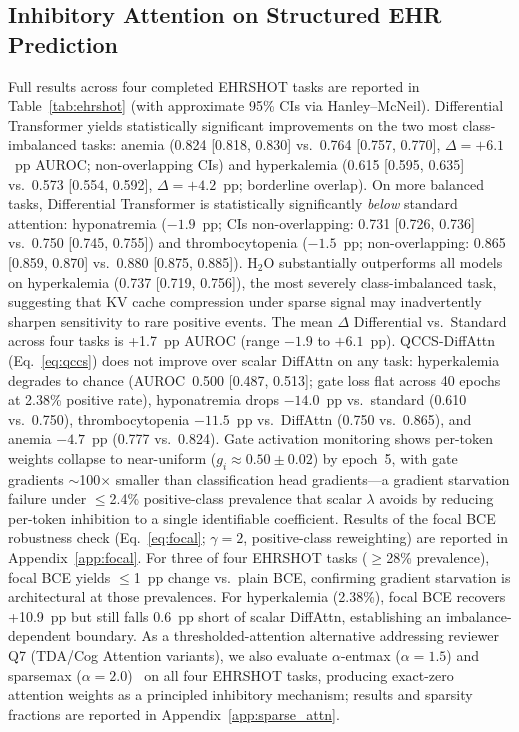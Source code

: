 \documentclass{article}
\begin{document}
\subsection{Inhibitory Attention on Structured EHR Prediction}

Full results across four completed EHRSHOT tasks are reported in
Table~\ref{tab:ehrshot} (with approximate 95\% CIs via Hanley--McNeil). Differential
Transformer yields statistically significant improvements on the two most
class-imbalanced tasks: anemia (0.824 [0.818, 0.830] vs.\ 0.764 [0.757, 0.770],
$\Delta{=}{+}6.1$~pp AUROC; non-overlapping CIs) and hyperkalemia (0.615 [0.595, 0.635]
vs.\ 0.573 [0.554, 0.592], $\Delta{=}{+}4.2$~pp; borderline overlap).
On more balanced tasks, Differential Transformer is statistically significantly
\emph{below} standard attention: hyponatremia ($-1.9$~pp; CIs non-overlapping:
0.731 [0.726, 0.736] vs.\ 0.750 [0.745, 0.755]) and thrombocytopenia
($-1.5$~pp; non-overlapping: 0.865 [0.859, 0.870] vs.\ 0.880 [0.875, 0.885]).
H$_2$O substantially outperforms all models on hyperkalemia (0.737 [0.719, 0.756]),
the most severely class-imbalanced task, suggesting that KV cache compression
under sparse signal may inadvertently sharpen sensitivity to rare positive events.
The mean $\Delta$ Differential vs.\ Standard across four tasks is +1.7~pp AUROC
(range $-1.9$ to $+6.1$~pp). QCCS-DiffAttn (Eq.~\ref{eq:qccs}) does not improve
over scalar DiffAttn on any task: hyperkalemia degrades to chance (AUROC~0.500
[0.487, 0.513]; gate loss flat across 40 epochs at 2.38\% positive rate),
hyponatremia drops $-14.0$~pp vs.\ standard (0.610 vs.\ 0.750), thrombocytopenia
$-11.5$~pp vs.\ DiffAttn (0.750 vs.\ 0.865), and anemia $-4.7$~pp (0.777 vs.\ 0.824).
Gate activation monitoring shows per-token weights collapse to near-uniform
($g_i \approx 0.50 \pm 0.02$) by epoch~5, with gate gradients $\sim$100$\times$
smaller than classification head gradients---a gradient starvation failure
under $\leq$2.4\% positive-class prevalence that scalar $\lambda$ avoids by
reducing per-token inhibition to a single identifiable coefficient.
Results of the focal BCE robustness check (Eq.~\ref{eq:focal}; $\gamma=2$,
positive-class reweighting) are reported in Appendix~\ref{app:focal}. For three
of four EHRSHOT tasks ($\geq$28\% prevalence), focal BCE yields $\leq$1~pp change
vs.\ plain BCE, confirming gradient starvation is architectural at those prevalences.
For hyperkalemia (2.38\%), focal BCE recovers +10.9~pp but still falls 0.6~pp
short of scalar DiffAttn, establishing an imbalance-dependent boundary.
As a thresholded-attention alternative addressing reviewer Q7 (TDA/Cog Attention
variants), we also evaluate $\alpha$-entmax ($\alpha{=}1.5$) and sparsemax
($\alpha{=}2.0$)~\cite{correia2019adaptively} on all four EHRSHOT tasks,
producing exact-zero attention weights as a principled inhibitory mechanism;
results and sparsity fractions are reported in Appendix~\ref{app:sparse_attn}.
\end{document}
